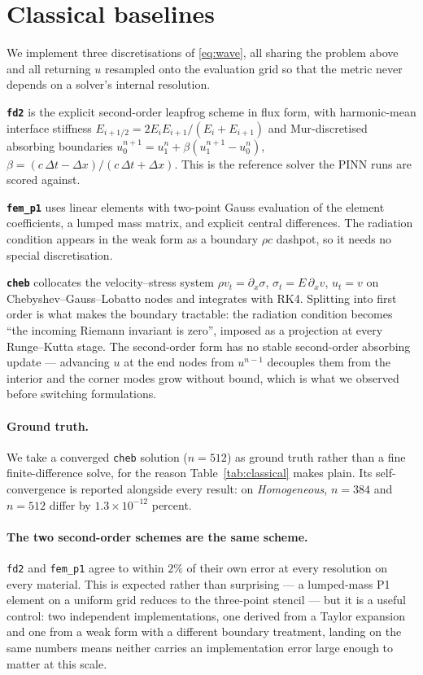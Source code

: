 \section{Classical baselines}
\label{sec:classical}

We implement three discretisations of \eqref{eq:wave}, all sharing the problem
above and all returning $u$ resampled onto the evaluation grid so that the
metric never depends on a solver's internal resolution.

\textbf{\texttt{fd2}} is the explicit second-order leapfrog scheme in flux
form, with harmonic-mean interface stiffness
$E_{i+1/2} = 2E_iE_{i+1}/(E_i+E_{i+1})$ and Mur-discretised absorbing
boundaries $u_0^{n+1} = u_1^{n} + \beta(u_1^{n+1} - u_0^{n})$,
$\beta = (c\,\Delta t - \Delta x)/(c\,\Delta t + \Delta x)$. This is the
reference solver the PINN runs are scored against.

\textbf{\texttt{fem\_p1}} uses linear elements with two-point Gauss evaluation
of the element coefficients, a lumped mass matrix, and explicit central
differences. The radiation condition appears in the weak form as a boundary
$\rho c$ dashpot, so it needs no special discretisation.

\textbf{\texttt{cheb}} collocates the velocity--stress system
$\rho v_t = \partial_x \sigma$, $\sigma_t = E\, \partial_x v$, $u_t = v$ on
Chebyshev--Gauss--Lobatto nodes and integrates with RK4. Splitting into first
order is what makes the boundary tractable: the radiation condition becomes
``the incoming Riemann invariant is zero'', imposed as a projection at every
Runge--Kutta stage. The second-order form has no stable second-order absorbing
update --- advancing $u$ at the end nodes from $u^{n-1}$ decouples them from
the interior and the corner modes grow without bound, which is what we observed
before switching formulations.

\paragraph{Ground truth.} We take a converged \texttt{cheb} solution
($n = 512$) as ground truth rather than a fine finite-difference solve, for the
reason Table~\ref{tab:classical} makes plain. Its self-convergence is reported
alongside every result: on \emph{Homogeneous}, $n = 384$ and $n = 512$ differ
by $1.3\times10^{-12}$ percent.



\paragraph{The two second-order schemes are the same scheme.} \texttt{fd2} and
\texttt{fem\_p1} agree to within $2\%$ of their own error at every resolution
on every material. This is expected rather than surprising --- a lumped-mass P1
element on a uniform grid reduces to the three-point stencil --- but it is a
useful control: two independent implementations, one derived from a Taylor
expansion and one from a weak form with a different boundary treatment,
landing on the same numbers means neither carries an implementation error large
enough to matter at this scale.

